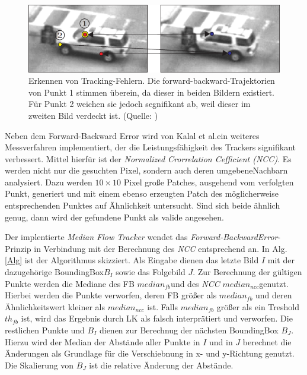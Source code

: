 \begin{figure}
\begin{centering}
\includegraphics[scale=0.7]{../pictures/MediaFlow.png}
\par\end{centering}

\caption[Erkennen von Tracking-Fehlern]{Erkennen von Tracking-Fehlern. Die forward-backward-Trajektorien von Punkt 1 stimmen überein, da dieser in beiden Bildern existiert. Für Punkt 2 weichen sie jedoch segnifikant ab, weil dieser im zweiten Bild verdeckt ist. (Quelle: \cite{key-3})\label{fig:Prinzip-des-Media}}
\end{figure}

Neben dem Forward-Backward Error wird von Kalal et al.\cite{TLD}ein weiteres Messverfahren implementiert, der die Leistungsfähigkeit des Trackers signifikant verbessert\cite{key-3}. Mittel hierfür ist der \textit{Normalized Crorrelation Cefficient (NCC)}. %
Es werden nicht nur die gesuchten Pixel, sondern auch deren umgebeneNachbarn analysiert. Dazu werden $10\times10$ Pixel große Patches, ausgehend vom verfolgten Punkt, generiert und mit einem ebenso erzeugten Patch des möglicherweise entsprechenden Punktes auf Ähnlichkeit untersucht. Sind sich beide ähnlich genug, dann wird der gefundene Punkt als valide angesehen.

Der implentierte \textit{Median Flow Tracker} wendet das \textit{Forward-BackwardError}-Prinzip in Verbindung mit der Berechnung des \textit{NCC} entsprechend \cite{key-5} an. In Alg.\ref{Alg} ist der Algorithmus skizziert. Als Eingabe dienen das letzte Bild $I$ mit der dazugehörige BoundingBox$B_{I}$ sowie das Folgebild $J$. Zur Berechnung der gültigen Punkte werden die Mediane des FB $median_{fb}$und des \textit{NCC} $median_{ncc}$genutzt. Hierbei werden die Punkte verworfen, deren FB größer als $median_{fb}$ und deren Ähnlichkeitswert kleiner als $median_{ncc}$ ist. Falls $median_{fb}$ größer als ein Treshold $th_{fb}$ ist, wird das Ergebnis durch LK als falsch interprätiert und verworfen. Die restlichen Punkte und $B_{I}$ dienen zur Berechnug der nächsten BoundingBox $B_{J}$. Hierzu wird der Median der Abstände aller Punkte in $I$ und in $J$ berechnet die Änderungen als Grundlage für die Verschiebnung in x- und y-Richtung genutzt. Die Skalierung von $B_{J}$ ist die relative
Änderung der Abstände.


